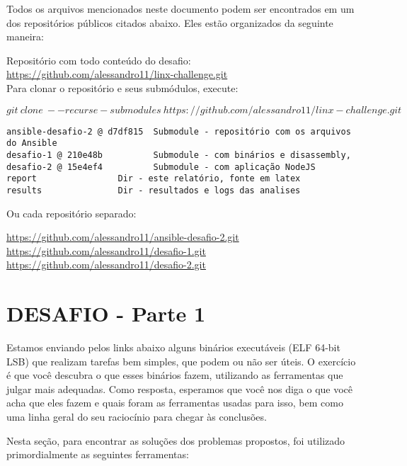 \pagebreak
Todos os arquivos mencionados neste documento podem ser encontrados em
um dos repositórios públicos citados abaixo. Eles estão organizados da
seguinte maneira:

\noindent Repositório com todo conteúdo do desafio:\\
\href{https://github.com/alessandro11/linx-challenge.git}{https://github.com/alessandro11/linx-challenge.git}\\

Para clonar o repositório e seus submódulos, execute:

$$git\ clone\ --recurse-submodules\ https://github.com/alessandro11/linx-challenge.git$$

\begin{verbatim}
ansible-desafio-2 @ d7df815  Submodule - repositório com os arquivos do Ansible
desafio-1 @ 210e48b          Submodule - com binários e disassembly,
desafio-2 @ 15e4ef4          Submodule - com aplicação NodeJS
report                Dir - este relatório, fonte em latex
results               Dir - resultados e logs das analises
\end{verbatim}

Ou cada repositório separado:

\noindent
\href{https://github.com/alessandro11/ansible-desafio-2.git}{https://github.com/alessandro11/ansible-desafio-2.git}\\
\href{https://github.com/alessandro11/desafio-1.git}{https://github.com/alessandro11/desafio-1.git}\\
\href{https://github.com/alessandro11/desafio-2.git}{https://github.com/alessandro11/desafio-2.git}

\section{DESAFIO - Parte 1} \label{sec:desafio1}

Estamos enviando pelos links abaixo alguns binários executáveis (ELF
64-bit LSB) que realizam tarefas bem simples, que podem ou não ser
úteis. O exercício é que você descubra o que esses binários fazem,
utilizando as ferramentas que julgar mais adequadas. Como resposta,
esperamos que você nos diga o que você acha que eles fazem e quais
foram as ferramentas usadas para isso, bem como uma linha geral do seu
raciocínio para chegar às conclusões.\\

\par Nesta seção, para encontrar as soluções dos problemas propostos, foi
utilizado primordialmente as seguintes ferramentas:

